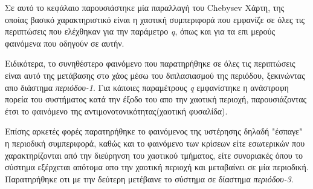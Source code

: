 Σε αυτό το κεφάλαιο παρουσιάστηκε μία παραλλαγή του Chebysev Χάρτη, της οποίας βασικό χαρακτηριστικό είναι η χαοτική συμπεριφορά που εμφανίζε σε όλες τις περιπτώσεις που ελέχθηκαν για την παράμετρο \emph{q}, όπως και για τα επι μερούς φαινόμενα που οδηγούν σε αυτήν.

Ειδικότερα, το συνηθέστερο φαινόμενο που παρατηρήθηκε σε όλες τις περιπτώσεις είναι αυτό της μετάβασης στο χάος μέσω του διπλασιασμού της περιόδου, ξεκινώντας απο διάστημα \emph{περιόδου-1}.
Για κάποιες παραμέτρους  \emph{q} εμφανίστηκε η ανάστροφη πορεία του συστήματος κατά την έξοδο του απο την χαοτική περιοχή, παρουσιάζοντας έτσι το φαινόμενο της αντιμονοτονικότητας(χαοτική φυσαλίδα).

Επίσης αρκετές φορές παρατηρήθηκε το φαινόμενος της υστέρησης δηλαδή "έσπαγε" η περιοδική συμπεριφορά, καθώς και το φαινόμενο των κρίσεων είτε εσωτερικών που χαρακτηρίζονται από την διεύρηνση του χαοτικού τμήματος, είτε συνοριακές όπου το σύστημα εξέρχεται απότομα απο την χαοτική περιοχή και μεταβαίνει σε μία περιοδική.
Παρατηρήθηκε οτι με  την δεύτερη μετέβαινε το σύστημα σε δίαστημα \emph{περιόδου-3}.